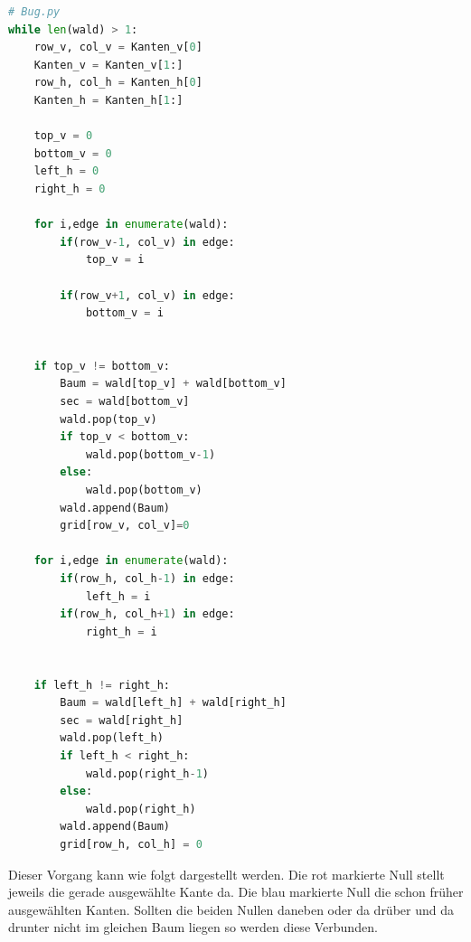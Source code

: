 \documentclass[12pt, a4paper, titlepage]{article}
\begin{document}
\begin{lstlisting}[language = Python]
# Bug.py
while len(wald) > 1:
	row_v, col_v = Kanten_v[0]
    Kanten_v = Kanten_v[1:]
    row_h, col_h = Kanten_h[0]
    Kanten_h = Kanten_h[1:]

    top_v = 0
    bottom_v = 0
    left_h = 0
    right_h = 0

    for i,edge in enumerate(wald):
        if(row_v-1, col_v) in edge:
            top_v = i
        
        if(row_v+1, col_v) in edge:
            bottom_v = i
            

    if top_v != bottom_v:
        Baum = wald[top_v] + wald[bottom_v]
        sec = wald[bottom_v]
        wald.pop(top_v)
        if top_v < bottom_v:
            wald.pop(bottom_v-1)
        else:
            wald.pop(bottom_v)
        wald.append(Baum)
        grid[row_v, col_v]=0

    for i,edge in enumerate(wald):
        if(row_h, col_h-1) in edge:
            left_h = i
        if(row_h, col_h+1) in edge:
            right_h = i


    if left_h != right_h:
        Baum = wald[left_h] + wald[right_h]
        sec = wald[right_h]
        wald.pop(left_h)
        if left_h < right_h:
            wald.pop(right_h-1)
        else:
            wald.pop(right_h)
        wald.append(Baum)
        grid[row_h, col_h] = 0
\end{lstlisting}

Dieser Vorgang kann wie folgt dargestellt werden. Die rot markierte Null stellt jeweils die gerade ausgewählte Kante da. Die blau markierte Null die schon früher ausgewählten Kanten. Sollten die beiden Nullen daneben oder da drüber und da drunter nicht im gleichen Baum liegen so werden diese Verbunden.
\end{document}
